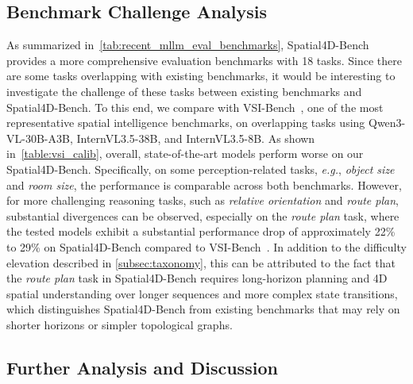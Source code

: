 \documentclass{article}
\newcommand{\eg}{\textit{e.g.}}
\begin{document}
\begin{table}
\caption{Comparison with VSI-Bench~\cite{Yang_2025_CVPR} on overlapping tasks.
Overall, state-of-the-art models perform worse on our Spatial4D-Bench, especially on the redefined \textit{route plan} task.
These results indicate that our Spatial4D-Bench is more challenging than VSI-Bench~\cite{Yang_2025_CVPR} on overlapping tasks.
}
\label{table:vsi_calib}
\end{table}



\subsection{Benchmark Challenge Analysis}
As summarized in~\cref{tab:recent_mllm_eval_benchmarks}, Spatial4D-Bench provides a more comprehensive evaluation benchmarks with 18 tasks.
Since there are some tasks overlapping with existing benchmarks, it would be interesting to investigate the challenge of these tasks between existing benchmarks and Spatial4D-Bench.
To this end, we compare with VSI-Bench~\cite{Yang_2025_CVPR}, one of the most representative spatial intelligence benchmarks, on overlapping tasks using Qwen3-VL-30B-A3B, InternVL3.5-38B, and InternVL3.5-8B.
As shown in~\cref{table:vsi_calib}, overall, state-of-the-art models perform worse on our Spatial4D-Bench.
Specifically, on some perception-related tasks, \eg, \textit{object size} and \textit{room size}, the performance is comparable across both benchmarks.
However, for more challenging reasoning tasks, such as \textit{relative orientation} and \textit{route plan}, substantial divergences can be observed, especially on the \textit{route plan} task, where the tested models exhibit a substantial performance drop of approximately 22\% to 29\% on Spatial4D-Bench compared to VSI-Bench~\cite{Yang_2025_CVPR}.
In addition to the difficulty elevation described in \cref{subsec:taxonomy}, this can be attributed to the fact that the \textit{route plan} task in Spatial4D-Bench requires long-horizon planning and 4D spatial understanding over longer sequences and more complex state transitions, which distinguishes Spatial4D-Bench from existing benchmarks that may rely on shorter horizons or simpler topological graphs.




\subsection{Further Analysis and Discussion}
\end{document}
